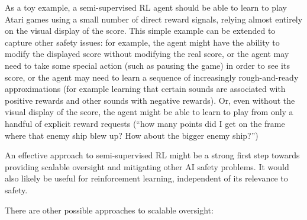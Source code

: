 \documentclass[a4paper,10pt]{article}
\begin{document}
As a toy example, a semi-supervised RL agent should be able to learn to play Atari games using a small number of direct reward signals, relying almost entirely on the visual display of the score. This simple example can be extended to capture other safety issues: for example, the agent might have the ability to modify the displayed score without modifying the real score, or the agent may need to take some special action (such as pausing the game) in order to see its score, or the agent may need to learn a sequence of increasingly rough-and-ready approximations (for example learning that certain sounds are associated with positive rewards and other sounds with negative rewards).  Or, even without the visual display of the score, the agent might be able to learn to play from only a handful of explicit reward requests (“how many points did I get on the frame where that enemy ship blew up?  How about the bigger enemy ship?”)

An effective approach to semi-supervised RL might be a strong first step towards providing scalable oversight and mitigating other AI safety problems.  It would also likely be useful for reinforcement learning, independent of its relevance to safety.  

There are other possible approaches to scalable oversight:
\end{document}
